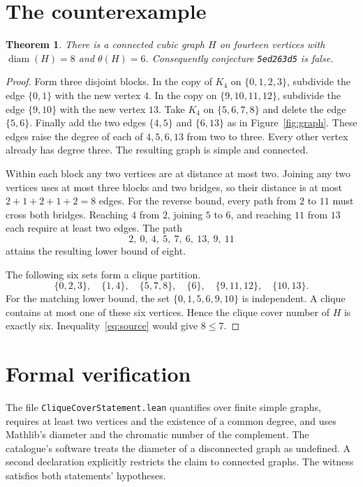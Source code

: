 \documentclass[11pt]{article}
\newtheorem{theorem}{Theorem}
\newcommand{\diam}{\operatorname{diam}}
\begin{document}
\section{The counterexample}
\begin{theorem}\label{thm:main}
There is a connected cubic graph $H$ on fourteen vertices with
$\diam(H)=8$ and $\theta(H)=6$. Consequently conjecture
\texttt{5ed263d5} is false.
\end{theorem}
\begin{proof}
Form three disjoint blocks. In the copy of $K_4$ on $\{0,1,2,3\}$,
subdivide the edge $\{0,1\}$ with the new vertex $4$. In the copy on
$\{9,10,11,12\}$, subdivide the edge $\{9,10\}$ with the new vertex $13$.
Take $K_4$ on $\{5,6,7,8\}$ and delete the edge $\{5,6\}$. Finally add the two
edges $\{4,5\}$ and $\{6,13\}$ as in Figure~\ref{fig:graph}. These edges raise the
degree of each of $4,5,6,13$ from two to three. Every other vertex already
has degree three. The resulting graph is simple and connected.

Within each block any two vertices are at distance at most two.
Joining any two vertices uses at most three blocks and two bridges,
so their distance is at most $2+1+2+1+2=8$ edges. For the reverse bound, every path
from $2$ to $11$ must cross both bridges. Reaching $4$ from $2$,
joining $5$ to $6$, and reaching $11$ from $13$ each require at least
two edges. The path
\[
    2,\ 0,\ 4,\ 5,\ 7,\ 6,\ 13,\ 9,\ 11
\]
attains the resulting lower bound of eight.

The following six sets form a clique partition.
\[
  \{0,2,3\},\quad \{1,4\},\quad \{5,7,8\},\quad
  \{6\},\quad \{9,11,12\},\quad \{10,13\}.
\]
For the matching lower bound, the set $\{0,1,5,6,9,10\}$ is independent.
A clique contains at most one of these six vertices. Hence the clique cover
number of $H$ is exactly six. Inequality~\eqref{eq:source} would give $8\leq7$.
\end{proof}

\section{Formal verification}
The file \texttt{CliqueCoverStatement.lean} quantifies over finite simple
graphs, requires at least two vertices and the existence of a common degree,
and uses Mathlib's diameter and the chromatic number of the complement.
The catalogue's software treats the diameter of a disconnected graph as
undefined. A second declaration explicitly restricts the claim to connected
graphs. The witness satisfies both statements' hypotheses.
\end{document}
